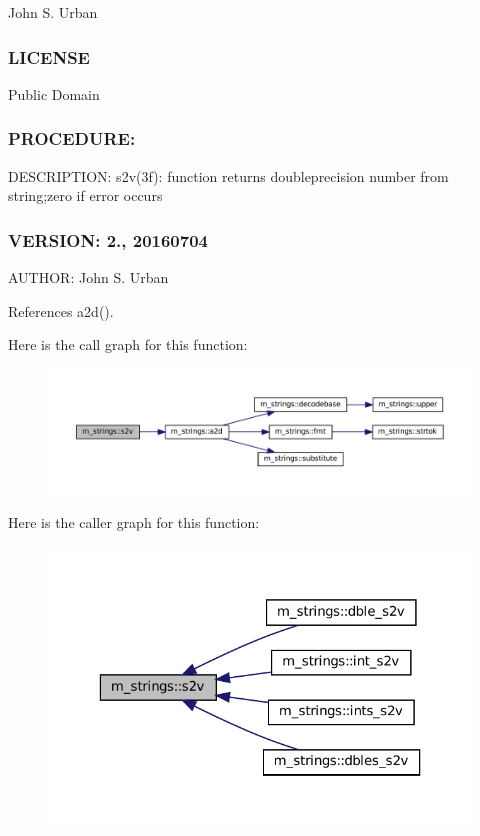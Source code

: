 John S. Urban \subsubsection*{L\+I\+C\+E\+N\+SE}

Public Domain

\subsubsection*{P\+R\+O\+C\+E\+D\+U\+RE\+:}

D\+E\+S\+C\+R\+I\+P\+T\+I\+ON\+: s2v(3f)\+: function returns doubleprecision number from string;zero if error occurs \subsubsection*{V\+E\+R\+S\+I\+ON\+: 2., 20160704}

A\+U\+T\+H\+OR\+: John S. Urban 

References a2d().

Here is the call graph for this function\+:
\nopagebreak
\begin{figure}[H]
\begin{center}
\leavevmode
\includegraphics[width=350pt]{namespacem__strings_ae0e2fe7c93e581402a74a7b59e5bb07f_cgraph}
\end{center}
\end{figure}
Here is the caller graph for this function\+:
\nopagebreak
\begin{figure}[H]
\begin{center}
\leavevmode
\includegraphics[width=323pt]{namespacem__strings_ae0e2fe7c93e581402a74a7b59e5bb07f_icgraph}
\end{center}
\end{figure}
\mbox{\label{namespacem__strings_ad7fffe79559a666aa28e1ed598b8670f}} 
